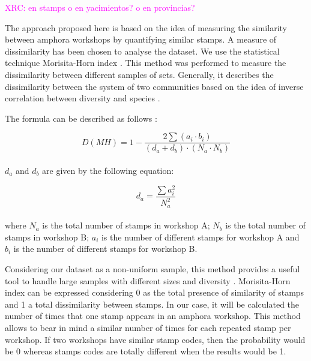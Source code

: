 \documentclass[review]{elsarticle}
\newcommand{\memo}[2]{\textcolor{#1}{#2}}
\newcommand{\xavi}[1]{\memo{magenta}{XRC: #1\\}}
\begin{document}
\xavi{en stamps o en yacimientos? o en provincias?}


The approach proposed here is based on the idea of measuring the similarity between amphora workshops by quantifying similar stamps. A measure of dissimilarity has been chosen to analyse the dataset. We use the statistical technique Morisita-Horn index \citep{morisita_measuring_1959, horn_measurement_1966}. This method was performed to measure the dissimilarity between different samples of sets. Generally, it describes the dissimilarity between the system of two communities based on the idea of inverse correlation between diversity and species \citep{magurran_why_1988}.

The formula can be described as follows \citep{magurran_measuring_2013}:

\begin{equation}
D(MH) = 1- \frac{2 \sum(a_{i} \cdot b_{i})}{(d_{a} + d_{b}) \cdot (N_{a} \cdot N_{b})}
\end{equation} \\

$d_{a}$ and $d_{b}$ are given by the following equation:

\begin{equation}
d_{a} = \frac{\sum a_{i}^{2}}{N_{a}^{2}} 
\end{equation} \\

where $N_{a}$ is the total number of stamps in workshop A; $N_{b}$ is the total number of stamps in workshop B; $a_{i}$ is the number of different stamps for workshop A and $b_{i}$ is the number of different stamps for workshop B.

Considering our dataset as a non-uniform sample, this method provides a useful tool to handle large samples with different sizes and diversity \citep{wolda_similarity_1981}. Morisita-Horn index can be expressed considering 0 as the total presence of similarity of stamps and 1 a total dissimilarity between stamps. In our case, it will be calculated the number of times that one stamp appears in an amphora workshop. This method allows to bear in mind a similar number of times for each repeated stamp per workshop. If two workshops have similar stamp codes, then the probability would be 0 whereas stamps codes are totally different when the results would be 1. 
\end{document}

